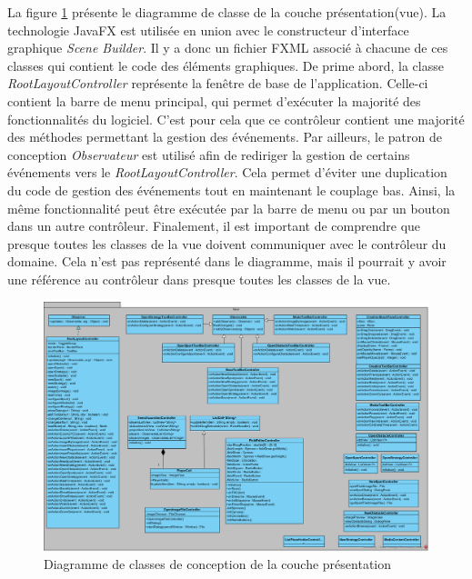 La figure \ref{fig:vue_classes_conception_diag} présente le diagramme de classe de la couche présentation(vue).
La technologie JavaFX est utilisée en union avec le constructeur d'interface graphique \textit{Scene Builder}.
Il y a donc un fichier FXML associé à chacune de ces classes qui contient le code des éléments graphiques.
De prime abord, la classe \textit{RootLayoutController} représente la fenêtre de base de l'application.
Celle-ci contient la barre de menu principal, qui permet d'exécuter la majorité des fonctionnalités du logiciel.
C'est pour cela que ce contrôleur contient une majorité des méthodes permettant la gestion des événements.
Par ailleurs, le patron de conception \textit{Observateur} est utilisé afin de rediriger la gestion de certains événements vers le \textit{RootLayoutController}.
Cela permet d'éviter une duplication du code de gestion des événements tout en maintenant le couplage bas.
Ainsi, la même fonctionnalité peut être exécutée par la barre de menu ou par un bouton dans un autre contrôleur.
Finalement, il est important de comprendre que presque toutes les classes de la vue doivent communiquer avec le contrôleur du domaine. 
Cela n'est pas représenté dans le diagramme, mais il pourrait y avoir une référence au contrôleur dans presque toutes les classes de la vue.


\begin{figure}[htpb]
    \centering
    \includegraphics[scale=0.4]{fig/classe_conception_view.png}
    \caption{Diagramme de classes de conception de la couche présentation}
    \label{fig:vue_classes_conception_diag}
\end{figure}

